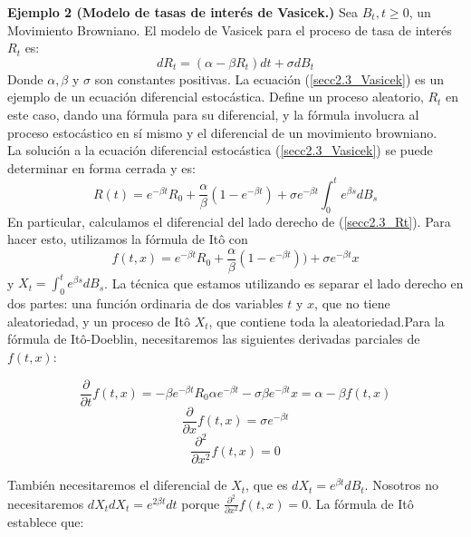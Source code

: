 \documentclass[11pt,notitlepage]{article}
\begin{document}
\textbf{Ejemplo 2 (Modelo de tasas de interés de Vasicek.)}  Sea $B_{t}, t \geq 0$, un Movimiento Browniano. El modelo de Vasicek para el proceso de tasa de interés $R_{t}$ es:
\begin{equation}\label{secc2.3_Vasicek}
    dR_{t}=(\alpha-\beta R_{t})dt+\sigma dB_{t}
\end{equation}
Donde $\alpha, \beta$ y $\sigma$ son constantes positivas. La ecuación (\ref{secc2.3_Vasicek}) es un ejemplo de un ecuación diferencial estocástica. Define un proceso aleatorio, $R_t$ en este caso, dando una fórmula para su diferencial, y la fórmula involucra al proceso estocástico en sí mismo y el diferencial de un movimiento browniano.\\
La solución a la ecuación diferencial estocástica (\ref{secc2.3_Vasicek}) se puede determinar en forma cerrada y es:
\begin{equation}\label{secc2.3_Rt}
    R(t)=e^{-\beta t}R_{0}+\frac{\alpha}{\beta}\left ( 1-e^{-\beta t} \right )+\sigma e^{-\beta t}\int_{0}^{t}e^{\beta s} dB_{s}
\end{equation}
En particular, calculamos el diferencial del lado derecho de (\ref{secc2.3_Rt}). Para hacer esto, utilizamos la fórmula de Itô con
\begin{equation*}
    f(t,x)=e^{-\beta t}R_{0}+\frac{\alpha}{\beta}\left ( 1-e^{-\beta t} \right ))+\sigma e^{-\beta t}x
\end{equation*}
y $X_{t}=\int_{0}^{t}e^{\beta s} dB_{s}$. La técnica que estamos utilizando es separar el lado derecho en dos partes: una función ordinaria de dos variables $t$ y $x$, que no tiene aleatoriedad, y un proceso de Itô $ X_{t}$, que contiene toda la aleatoriedad.Para la fórmula de Itô-Doeblin, necesitaremos las siguientes derivadas parciales de $f (t, x)$:

\begin{equation*}
    \frac{\partial}{\partial t}f(t,x)= - \beta e^{-\beta t}R_{0}\alpha e^{-\beta t}-\sigma\beta e^{-\beta t}x=\alpha -\beta f(t,x)
\end{equation*}
\begin{equation*}
     \frac{\partial}{\partial x}f(t,x)=\sigma e^{-\beta t}
\end{equation*}
\begin{equation*}
    \frac{\partial^2}{\partial x^2}f(t,x)=0
\end{equation*}

También necesitaremos el diferencial de $X_{t}$, que es $dX_{t} = e^{\beta t} dB_{t}$. Nosotros no necesitaremos $dX_{t}dX_{t}= e^{2 \beta t} dt $ porque $\frac{\partial^2}{\partial x^2}f(t,x)=0$. La fórmula de Itô establece que:
\end{document}
